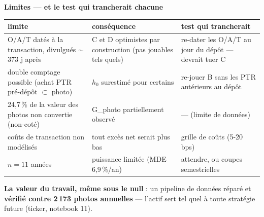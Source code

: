 \documentclass[10pt,a4paper,landscape]{article}
\begin{document}
\begin{minipage}[t]{0.50\textwidth}\vspace{0pt}
\textbf{Limites --- et le test qui trancherait chacune}
\begin{center}\small
\begin{tabularx}{\linewidth}{@{}XXX@{}}
\toprule
limite & conséquence & test qui trancherait \\
\midrule
O/A/T datés à la transaction, divulgués $\sim$373 j après & C et D optimistes par construction (pas jouables tels quels) & re-dater les O/A/T au jour du dépôt --- devrait tuer C \\
double comptage possible (achat PTR pré-dépôt $\subset$ photo) & $h_0$ surestimé pour certains & re-jouer B sans les PTR antérieurs au dépôt \\
24,7\,\% de la valeur des photos non convertie (non-coté) & G\_photo partiellement observé & --- (limite de données) \\
coûts de transaction non modélisés & tout excès net serait plus bas & grille de coûts (5-20 bps) \\
$n = 11$ années & puissance limitée (MDE 6,9\,\%/an) & attendre, ou coupes semestrielles \\
\bottomrule
\end{tabularx}
\end{center}

\vspace{1.5mm}
\textbf{La valeur du travail, même sous le null} : un pipeline de données réparé et \textbf{vérifié contre
2\,173 photos annuelles} --- l'actif sert tel quel à toute stratégie future (ticker, notebook 11).
\end{minipage}
\end{document}
